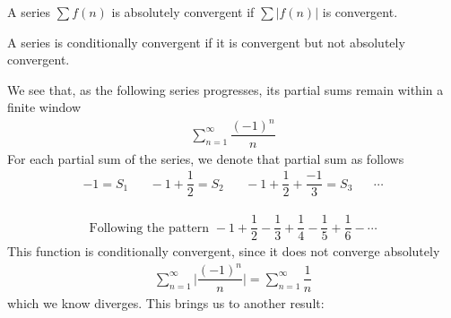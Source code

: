 \begin{definition}
A series $\sum f(n)$ is absolutely convergent if $\sum \lvert f(n) \rvert$ is convergent. 
\end{definition}

\begin{definition}
A series is conditionally convergent if it is convergent but not absolutely convergent.
\label{conditional_convergence}
\end{definition}

\begin{example}
We see that, as the following series progresses, its partial sums remain within a finite window
\begin{align*}
    \sum_{n = 1}^{\infty} \dfrac{(-1)^{n}}{n}
\end{align*}
For each partial sum of the series, we denote that partial sum as follows
\begin{align*}
    -1 = S_{1} \hspace{20pt} -1 + \dfrac{1}{2} = S_{2} \hspace{20pt} -1 + \dfrac{1}{2} + \dfrac{-1}{3} = S_{3} \hspace{20pt} \cdots
\end{align*}
\begin{align*}
    \text{Following the pattern} \hspace{4pt} -1 + \dfrac{1}{2} - \dfrac{1}{3} + \dfrac{1}{4} - \dfrac{1}{5} + \dfrac{1}{6} - \cdots
\end{align*}
This function is conditionally convergent, since it does not converge absolutely
\begin{align*}
    \sum_{n=1}^{\infty} \Big\lvert \dfrac{(-1)^{n}}{n} \Big\rvert = \sum_{n=1}^{\infty} \dfrac{1}{n}
\end{align*}
\label{example_3_conditional_convergence}
which we know diverges. This brings us to another result:
\end{example}

